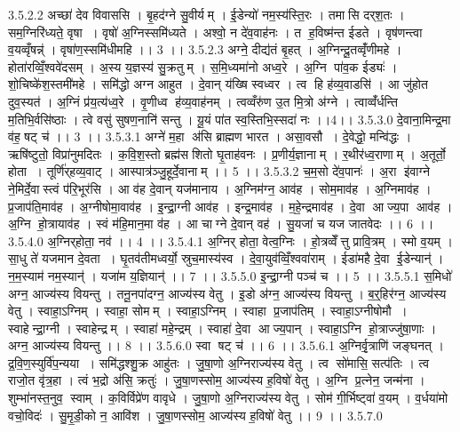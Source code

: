3.5.2.2
अच्छा॑ देव विवाससि । बृ॒हद॑ग्ने सु॒वीर्यम् । ई॒डेन्यो॑ नम॒स्य॑स्ति॒रः । तमा॑सि दर्‌श॒तः । सम॒ग्निरि॑ध्यते॒ वृषा । वृषो॑ अ॒ग्निस्समि॑ध्यते । अश्वो॒ न दे॑व॒वाह॑नः । त ह॒विष्म॑न्त ईडते । वृष॑णन्त्वा व॒यव्वृँषन्न्॑ । वृषा॑ण॒स्समि॑धीमहि ।। 3 ।।
3.5.2.3
अग्ने॒ दीद्य॑तं बृ॒हत् । अ॒ग्निन्दू॒तव्वृँ॑णीमहे । होता॑रव्विँ॒श्ववे॑दसम् । अ॒स्य य॒ज्ञस्य॑ सु॒क्रतुम् । स॒मि॒ध्यमा॑नो अध्व॒रे । अ॒ग्नि पा॑व॒क ईड्यः॑ । शो॒चिष्के॑श॒स्तमी॑महे । समि॑द्धो अग्न आहुत । दे॒वान् य॑ख्षि स्वध्वर । त्व हि ह॑व्य॒वाडसि॑ । आ जु॑होत दुव॒स्यत॑ । अ॒ग्निं प्र॑य॒त्य॑ध्व॒रे । वृ॒णीध्व ह॑व्य॒वाह॑नम् । त्वव्वँरु॑ण उ॒त मि॒त्रो अ॑ग्ने । त्वाव्वँ॑र्धन्ति म॒तिभि॒र्वसि॑ष्ठाः । त्वे वसु॑ सुषण॒नानि॑ सन्तु । यू॒यं पा॑त स्व॒स्तिभि॒स्सदा॑ नः ।।4।।
3.5.3.0
दे॒वाना॒मिन्द्र॒मा व॑ह॒ षट् च॑ ।। 3 ।।
3.5.3.1
अग्ने॑ म॒हा अ॑सि ब्राह्मण भारत । असा॒वसौ । दे॒वेद्धो॒ मन्वि॑द्धः । ऋषि॑ष्टुतो॒ विप्रा॑नुमदितः । क॒वि॒श॒स्तो ब्रह्म॑सशितो घृ॒ताह॑वनः । प्र॒णीर्य॒ज्ञानाम् । र॒थीर॑ध्व॒राणाम् । अ॒तूर्तो॒ होता । तूर्णि॑र्‌हव्य॒वाट् । आस्पात्र॑ञ्जु॒हूर्दे॒वानाम् ।। 5 ।।
3.5.3.2
च॒म॒सो दे॑व॒पानः॑ । अ॒रा इ॑वाग्ने ने॒मिर्दे॒वास्त्वं प॑रि॒भूर॑सि । आ व॑ह दे॒वान् यज॑मानाय । अ॒ग्निम॑ग्न॒ आव॑ह । सोम॒माव॑ह । अ॒ग्निमाव॑ह । प्र॒जाप॑ति॒माव॑ह । अ॒ग्नीषोमा॒वाव॑ह । इ॒न्द्रा॒ग्नी आव॑ह । इन्द्र॒माव॑ह । म॒हे॒न्द्रमाव॑ह । दे॒वा आज्य॒पा आव॑ह । अ॒ग्नि हो॒त्रायाव॑ह । स्वं म॑हि॒मान॒मा व॑ह । आ चाग्ने दे॒वान् वह॑ । सु॒यजा॑ च यज जातवेदः ।। 6 ।।
3.5.4.0
अ॒ग्निर्‌होता॒ नव॑ ।। 4 ।।
3.5.4.1
अ॒ग्निर् होता॒ वेत्व॒ग्निः । हो॒त्रव्वेँत्तु प्रावि॒त्रम् । स्मो व॒यम् । सा॒धु ते॑ यजमान दे॒वता । घृ॒तव॑तीमध्वर्यो॒ स्रुच॒मास्य॑स्व । दे॒वा॒युव॑व्विँ॒श्ववा॑राम् । ईडा॑महै दे॒वा ई॒डेन्यान्॑ । न॒म॒स्याम॑ नम॒स्यान्॑ । यजा॑म य॒ज्ञियान्॑ ।। 7 ।।
3.5.5.0
इ॒न्द्रा॒ग्नी पञ्च॑ च ।। 5 ।।
3.5.5.1
स॒मिधो॑ अग्न॒ आज्य॑स्य वियन्तु । तनू॒नपा॑दग्न॒ आज्य॑स्य वेतु । इ॒डो अ॑ग्न॒ आज्य॑स्य वियन्तु । ब॒र्॒हिर॑ग्न॒ आज्य॑स्य वेतु । स्वाहा॒ऽग्निम् । स्वाहा॒ सोमम् । स्वाहा॒ऽग्निम् । स्वाहा प्र॒जाप॑तिम् । स्वाहा॒ऽग्नीषोमौ । स्वाहेन्द्रा॒ग्नी । स्वाहेन्द्रम् । स्वाहा॑ महे॒न्द्रम् । स्वाहा॑ दे॒वा आज्य॒पान् । स्वाहा॒ऽग्नि हो॒त्राज्जु॑षा॒णाः । अग्न॒ आज्य॑स्य वियन्तु ।। 8 ।।
3.5.6.0
स्वा षट् च॑ ।। 6 ।।
3.5.6.1
अ॒ग्निर्वृ॒त्राणि॑ जङ्घनत् । द्र॒वि॒ण॒स्युर्वि॑प॒न्यया । समि॑द्धश्शु॒क्र आहु॑तः । जु॒षा॒णो अ॒ग्निराज्य॑स्य वेतु । त्व सो॑मासि॒ सत्प॑तिः । त्व राजो॒त वृ॑त्र॒हा । त्वं भ॒द्रो अ॑सि॒ क्रतुः॑ । जु॒षा॒णस्सोम॒ आज्य॑स्य ह॒विषो॑ वेतु । अ॒ग्नि प्र॒त्नेन॒ जन्म॑ना । शुम्भा॑नस्त॒नुव॒ स्वाम् । क॒विर्विप्रे॑ण वावृधे । जु॒षा॒णो अ॒ग्निराज्य॑स्य वेतु । सोम॑ गी॒र्भिष्ट्वा॑ व॒यम् । व॒र्धया॑मो वचो॒विदः॑ । सु॒मृ॒डी॒को न॒ आवि॑श । जु॒षा॒णस्सोम॒ आज्य॑स्य ह॒विषो॑ वेतु ।। 9 ।।
3.5.7.0
